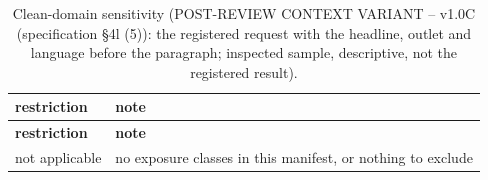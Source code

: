 \begingroup\footnotesize
\begin{longtable}{>{\raggedright\arraybackslash}p{126.4pt}>{\raggedright\arraybackslash}p{304.6pt}}
\caption{Clean-domain sensitivity (POST-REVIEW CONTEXT VARIANT -- v1.0C (specification §4l (5)):\allowbreak{} the registered request with the headline, outlet and language before the paragraph; inspected sample, descriptive, not the registered result).} \\
\toprule
\textbf{restriction} & \textbf{note} \\
\midrule
\endfirsthead
\toprule
\textbf{restriction} & \textbf{note} \\
\midrule
\endhead
\bottomrule
\endfoot
not applicable & no exposure classes in this manifest, or nothing to exclude \\
\end{longtable}
\endgroup
